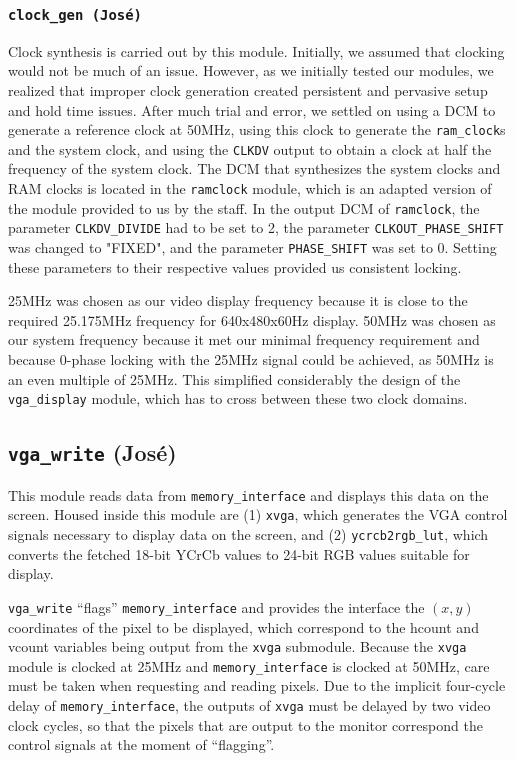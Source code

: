 \documentclass[10pt]{article}
\begin{document}
\subsubsection{{\tt clock\_gen (Jos\'{e})}}
Clock synthesis is carried out by this module. Initially, we assumed that clocking would not be much of an issue. However, as we initially tested our modules, we realized that improper clock generation created persistent and pervasive setup and hold time issues. After much trial and error, we settled on using a DCM to generate a reference clock at 50MHz, using this clock to generate the {\tt ram\_clock}s and the system clock, and using the {\tt CLKDV} output to obtain a clock at half the frequency of the system clock. The DCM that synthesizes the system clocks and RAM clocks is located in the {\tt ramclock} module, which is an adapted version of the module provided to us by the staff. In the output DCM of {\tt ramclock}, the parameter {\tt CLKDV\_DIVIDE} had to be set to 2, the parameter {\tt CLKOUT\_PHASE\_SHIFT} was changed to "FIXED", and the parameter {\tt PHASE\_SHIFT} was set to 0. Setting these parameters to their respective values provided us consistent locking.

25MHz was chosen as our video display frequency because it is close to the required 25.175MHz frequency for 640x480x60Hz display. 50MHz was chosen as our system frequency because it met our minimal frequency requirement and because 0-phase locking with the 25MHz signal could be achieved, as 50MHz is an even multiple of 25MHz. This simplified considerably the design of the {\tt vga\_display} module, which has to cross between these two clock domains.

\subsection{{\tt vga\_write} (Jos\'{e})}
This module reads data from {\tt memory\_interface} and displays this data on the screen. Housed inside this module are (1) {\tt xvga}, which generates the VGA control signals necessary to display data on the screen, and (2) {\tt ycrcb2rgb\_lut}, which converts the fetched 18-bit YCrCb values to 24-bit RGB values suitable for display.

{\tt vga\_write} ``flags'' {\tt memory\_interface} and provides the interface the $(x,y)$ coordinates of the pixel to be displayed, which correspond to the hcount and vcount variables being output from the {\tt xvga} submodule. Because the {\tt xvga} module is clocked at 25MHz and {\tt memory\_interface} is clocked at 50MHz, care must be taken when requesting and reading pixels. Due to the implicit four-cycle delay of {\tt memory\_interface}, the outputs of {\tt xvga} must be delayed by two video clock cycles, so that the pixels that are output to the monitor correspond the control signals at the moment of ``flagging''. 
\end{document}
